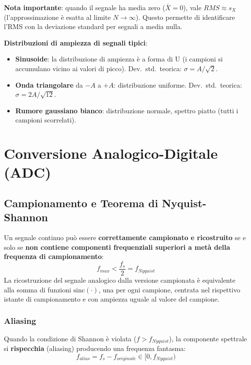 \textbf{Nota importante}: quando il segnale ha media zero ($\bar{X} = 0$), vale $RMS \approx s_X$ (l'approssimazione è esatta al limite $N \to \infty$). Questo permette di identificare l'RMS con la deviazione standard per segnali a media nulla.

\textbf{Distribuzioni di ampiezza di segnali tipici}:
\begin{itemize}
    \item \textbf{Sinusoide}: la distribuzione di ampiezza è a forma di U (i campioni si accumulano vicino ai valori di picco). Dev.\ std.\ teorica: $\sigma = A/\sqrt{2}$.
    \item \textbf{Onda triangolare} da $-A$ a $+A$: distribuzione uniforme. Dev.\ std.\ teorica: $\sigma = 2A/\sqrt{12}$.
    \item \textbf{Rumore gaussiano bianco}: distribuzione normale, spettro piatto (tutti i campioni scorrelati).
\end{itemize}

\section{Conversione Analogico-Digitale (ADC)}

\subsection{Campionamento e Teorema di Nyquist-Shannon}

\begin{definizione}
Un segnale continuo può essere \textbf{correttamente campionato e ricostruito} se e solo se \textbf{non contiene componenti frequenziali superiori a metà della frequenza di campionamento}:
\[
f_{max} < \frac{f_s}{2} = f_{Nyquist}
\]
La ricostruzione del segnale analogico dalla versione campionata è equivalente alla somma di funzioni $\text{sinc}(\cdot)$, una per ogni campione, centrata nel rispettivo istante di campionamento e con ampiezza uguale al valore del campione.
\end{definizione}

\subsubsection{Aliasing}

Quando la condizione di Shannon è violata ($f > f_{Nyquist}$), la componente spettrale si \textbf{rispecchia} (aliasing) producendo una frequenza fantasma:
\[
f_{alias} = f_s - f_{originale} \in [0, f_{Nyquist})
\]

